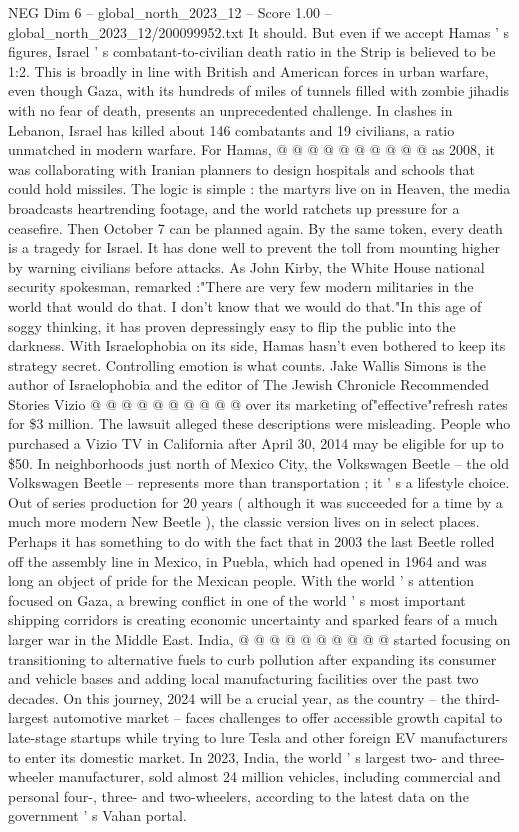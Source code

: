 \begin{textsample}{NEG Dim 6 – global\_north\_2023\_12 – Score 1.00 – global\_north\_2023\_12/200099952.txt}
It should.
But even if we accept Hamas ' s figures, Israel ' s combatant-to-civilian death ratio in the Strip is believed to be 1:2.
This is broadly in line with British and American forces in urban warfare, even though Gaza, with its hundreds of miles of tunnels filled with zombie jihadis with no fear of death, presents an unprecedented challenge.
In clashes in Lebanon, Israel has killed about 146 combatants and 19 civilians, a ratio unmatched in modern warfare.
For Hamas, @ @ @ @ @ @ @ @ @ @ as 2008, it was collaborating with Iranian planners to design hospitals and schools that could hold missiles.
The logic is simple : the martyrs live on in Heaven, the media broadcasts heartrending footage, and the world ratchets up pressure for a ceasefire.
Then October 7 can be planned again.
By the same token, every death is a tragedy for Israel.
It has done well to prevent the toll from mounting higher by warning civilians before attacks.
As John Kirby, the White House national security spokesman, remarked :"There are very few modern militaries in the world that would do that.
I don't know that we would do that."In this age of soggy thinking, it has proven depressingly easy to flip the public into the darkness.
With Israelophobia on its side, Hamas hasn't even bothered to keep its strategy secret.
Controlling emotion is what counts.
Jake Wallis Simons is the author of Israelophobia and the editor of The Jewish Chronicle Recommended Stories Vizio @ @ @ @ @ @ @ @ @ @ over its marketing of"effective"refresh rates for \$3 million.
The lawsuit alleged these descriptions were misleading.
People who purchased a Vizio TV in California after April 30, 2014 may be eligible for up to \$50.
In neighborhoods just north of Mexico City, the Volkswagen Beetle -- the old Volkswagen Beetle -- represents more than transportation ; it ' s a lifestyle choice.
Out of series production for 20 years ( although it was succeeded for a time by a much more modern New Beetle ), the classic version lives on in select places.
Perhaps it has something to do with the fact that in 2003 the last Beetle rolled off the assembly line in Mexico, in Puebla, which had opened in 1964 and was long an object of pride for the Mexican people.
With the world ' s attention focused on Gaza, a brewing conflict in one of the world ' s most important shipping corridors is creating economic uncertainty and sparked fears of a much larger war in the Middle East.
India, @ @ @ @ @ @ @ @ @ @ started focusing on transitioning to alternative fuels to curb pollution after expanding its consumer and vehicle bases and adding local manufacturing facilities over the past two decades.
On this journey, 2024 will be a crucial year, as the country -- the third-largest automotive market -- faces challenges to offer accessible growth capital to late-stage startups while trying to lure Tesla and other foreign EV manufacturers to enter its domestic market.
In 2023, India, the world ' s largest two- and three-wheeler manufacturer, sold almost 24 million vehicles, including commercial and personal four-, three- and two-wheelers, according to the latest data on the government ' s Vahan portal.

\end{textsample}
